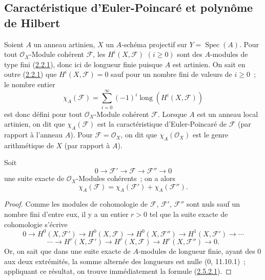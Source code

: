 \subsection{Caractéristique d'Euler-Poincaré et polynôme de Hilbert}
\label{subsection:III.2.5-fr}

\begin{env}[2.5.1]
\label{III.2.5.1-fr}
Soient $A$ un anneau artinien, $X$ un $A$-schéma projectif sur
$Y=\operatorname{Spec}(A)$. Pour tout $\mathcal O_X$-Module cohérent
$\mathcal F$, les $H^i(X,\mathcal F)$ $(i\geq0)$ sont des $A$-modules de
type fini (\hyperref[III.2.2.1-fr]{2.2.1}), donc ici de longueur finie
puisque $A$ est artinien. On sait en outre
(\hyperref[III.2.2.1-fr]{2.2.1}) que $H^i(X,\mathcal F)=0$ sauf pour un
nombre fini de valeurs de $i\geq0$~; le nombre entier
\[
\chi_A(\mathcal F)=\sum_{i=0}^{\infty}(-1)^i
\operatorname{long}(H^i(X,\mathcal F))
\tag{2.5.1.1}\label{III.2.5.1.1-fr}
\]
est donc défini pour tout $\mathcal O_X$-Module cohérent $\mathcal F$.
Lorsque $A$ est un anneau local artinien, on dit que $\chi_A(\mathcal F)$
est la caractéristique d'Euler-Poincaré de $\mathcal F$ (par rapport à
l'anneau $A$). Pour $\mathcal F=\mathcal O_X$, on dit que
$\chi_A(\mathcal O_X)$ est le genre arithmétique de $X$ (par rapport à
$A$).
\end{env}

\begin{proposition}[2.5.2]
\label{III.2.5.2-fr}
Soit
\[
0\longrightarrow\mathcal F'\longrightarrow\mathcal F
\longrightarrow\mathcal F''\longrightarrow0
\]
une suite exacte de $\mathcal O_X$-Modules cohérents~; on a alors
\[
\chi_A(\mathcal F)=\chi_A(\mathcal F')+\chi_A(\mathcal F'').
\tag{2.5.2.1}\label{III.2.5.2.1-fr}
\]
\end{proposition}

\begin{proof}
Comme les modules de cohomologie de $\mathcal F$, $\mathcal F'$,
$\mathcal F''$ sont nuls sauf un nombre fini d'entre eux, il y a un
entier $r>0$ tel que la suite exacte de cohomologie s'écrive
\[
0\to H^0(X,\mathcal F')\to H^0(X,\mathcal F)
\to H^0(X,\mathcal F'')\to H^1(X,\mathcal F')\to\cdots
\]
\[
\cdots\to H^r(X,\mathcal F')\to H^r(X,\mathcal F)
\to H^r(X,\mathcal F'')\to0.
\]
Or, on sait que dans une suite exacte de $A$-modules de longueur finie,
ayant des 0 aux deux extrémités, la somme alternée des longueurs est
nulle (0, 11.10.1)~; appliquant ce résultat, on trouve immédiatement la
formule (\hyperref[III.2.5.2.1-fr]{2.5.2.1}).
\end{proof}

